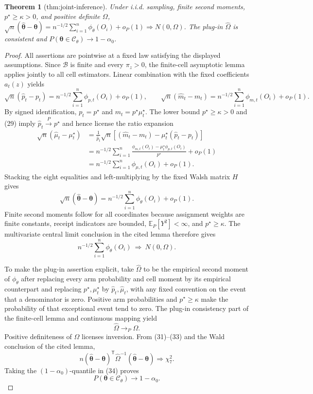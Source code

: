 \documentclass{article}
\newtheorem{theorem}{Theorem}
\begin{document}
\begin{theorem}[thm:joint-inference]\label{thm:joint-inference}
Under i.i.d. sampling, finite second moments, \(p^\star\ge\kappa>0\), and positive definite \(\Omega\), \(\sqrt n(\widehat{\boldsymbol\theta}-\boldsymbol\theta)=n^{-1/2}\sum_{i=1}^n\phi_{\theta}(O_i)+o_P(1)\Rightarrow N(0,\Omega)\). The plug-in \(\widehat\Omega\) is consistent and \(P(\boldsymbol\theta\in\mathcal C_{\theta})\to1-\alpha_0\).
\end{theorem}
\begin{proof}
All assertions are pointwise at a fixed law satisfying the displayed assumptions.  Since \(\mathcal B\) is finite and every \(\pi_z>0\), the finite-cell asymptotic lemma applies jointly to all cell estimators.  Linear combination with the fixed coefficients \(a_t(z)\) yields
\[
\sqrt n(\widehat p_t-p_t)
=n^{-1/2}\sum_{i=1}^n\phi_{p,t}(O_i)+o_P(1),
\qquad
\sqrt n(\widehat m_t-m_t)
=n^{-1/2}\sum_{i=1}^n\phi_{m,t}(O_i)+o_P(1). \tag{29}
\]
By signed identification, \(p_t=p^\star\) and \(m_t=p^\star\mu_t^\star\).  The lower bound \(p^\star\ge\kappa>0\) and (29) imply \(\widehat p_t\xrightarrow{P}p^\star\) and hence license the ratio expansion
\[
\begin{aligned}
\sqrt n(\widehat\mu_t-\mu_t^\star)
&=\frac{1}{\widehat p_t}\sqrt n
 \left[(\widehat m_t-m_t)-\mu_t^\star(\widehat p_t-p_t)\right]\\
&=n^{-1/2}\sum_{i=1}^n
 \frac{\phi_{m,t}(O_i)-\mu_t^\star\phi_{p,t}(O_i)}{p^\star}
 +o_P(1)\\
&=n^{-1/2}\sum_{i=1}^n\phi_{\mu,t}(O_i)+o_P(1).
\end{aligned} \tag{30}
\]
Stacking the eight equalities and left-multiplying by the fixed Walsh matrix \(H\) gives
\[
\sqrt n(\widehat{\boldsymbol\theta}-\boldsymbol\theta)
=n^{-1/2}\sum_{i=1}^n\phi_\theta(O_i)+o_P(1). \tag{31}
\]
Finite second moments follow for all coordinates because assignment weights are finite constants, receipt indicators are bounded, \(\mathbb E_P[Y^2]<\infty\), and \(p^\star\ge\kappa\).  The multivariate central limit conclusion in the cited lemma therefore gives
\[
n^{-1/2}\sum_{i=1}^n\phi_\theta(O_i)\ \Rightarrow\ N(0,\Omega). \tag{32}
\]

To make the plug-in assertion explicit, take \(\widehat\Omega\) to be the empirical second moment of \(\phi_\theta\) after replacing every arm probability and cell moment by its empirical counterpart and replacing \(p^\star,\mu_t^\star\) by \(\widehat p_t,\widehat\mu_t\), with any fixed convention on the event that a denominator is zero.  Positive arm probabilities and \(p^\star\ge\kappa\) make the probability of that exceptional event tend to zero.  The plug-in consistency part of the finite-cell lemma and continuous mapping yield
\[
\widehat\Omega\to_P\Omega. \tag{33}
\]
Positive definiteness of \(\Omega\) licenses inversion.  From (31)--(33) and the Wald conclusion of the cited lemma,
\[
n(\widehat{\boldsymbol\theta}-\boldsymbol\theta)^{\mathsf T}
\widehat\Omega^{-1}
(\widehat{\boldsymbol\theta}-\boldsymbol\theta)
\Rightarrow\chi_7^2. \tag{34}
\]
Taking the \((1-\alpha_0)\)-quantile in (34) proves
\[
P(\boldsymbol\theta\in\mathcal C_\theta)\longrightarrow1-\alpha_0.
\]
\end{proof}
\end{document}
